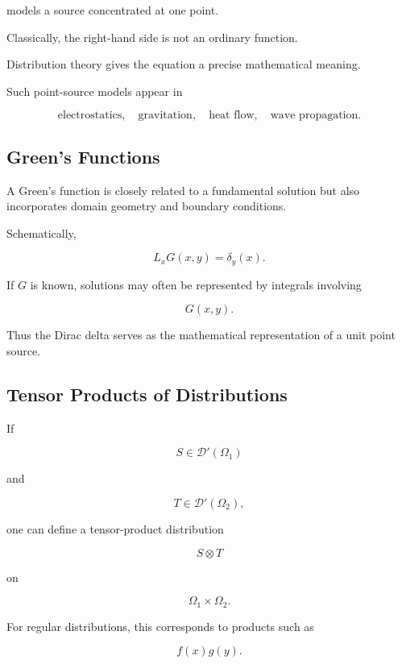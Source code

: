 models a source concentrated at one point.

Classically, the right-hand side is not an ordinary function.

Distribution theory gives the equation a precise mathematical meaning.

Such point-source models appear in

\[
\boxed{
\text{electrostatics},
\quad
\text{gravitation},
\quad
\text{heat flow},
\quad
\text{wave propagation}.
}
\]

\subsection{Green's Functions}
\label{subsec:distribution-greens-functions}

A Green's function is closely related to a fundamental solution but also
incorporates domain geometry and boundary conditions.

Schematically,

\[
\boxed{
L_xG(x,y)
=
\delta_y(x).
}
\]

If \(G\) is known, solutions may often be represented by integrals
involving

\[
G(x,y).
\]

Thus the Dirac delta serves as the mathematical representation of a unit
point source.

\subsection{Tensor Products of Distributions}
\label{subsec:tensor-products-distributions}

If

\[
S\in\mathcal{D}'(\Omega_1)
\]

and

\[
T\in\mathcal{D}'(\Omega_2),
\]

one can define a tensor-product distribution

\[
\boxed{
S\otimes T
}
\]

on

\[
\Omega_1\times\Omega_2.
\]

For regular distributions, this corresponds to products such as

\[
f(x)g(y).
\]


